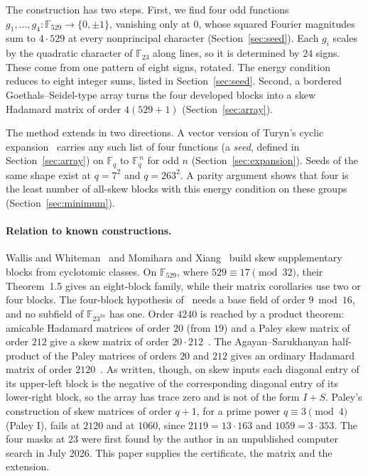 \documentclass[11pt]{article}
\theoremstyle{remark}
\newcommand{\F}{\mathbb F}
\begin{document}
The construction has two steps. First, we find four odd functions $g_1,\dots,g_4\colon\F_{529}\to\{0,\pm1\}$, vanishing only at $0$, whose squared Fourier magnitudes sum to $4\cdot529$ at every nonprincipal character (Section~\ref{sec:seed}). Each $g_i$ scales by the quadratic character of $\F_{23}$ along lines, so it is determined by $24$ signs. These come from one pattern of eight signs, rotated. The energy condition reduces to eight integer sums, listed in Section~\ref{sec:seed}. Second, a bordered Goethals--Seidel-type array turns the four developed blocks into a skew Hadamard matrix of order $4(529+1)$ (Section~\ref{sec:array}).

The method extends in two directions. A vector version of Turyn's cyclic expansion~\cite{Turyn71,Mom} carries any such list of four functions (a \emph{seed}, defined in Section~\ref{sec:array}) on $\F_q$ to $\F_q^{\,n}$ for odd $n$ (Section~\ref{sec:expansion}). Seeds of the same shape exist at $q=7^2$ and $q=263^2$. A parity argument shows that four is the least number of all-skew blocks with this energy condition on these groups (Section~\ref{sec:minimum}).

\paragraph{Relation to known constructions.}
Wallis and Whiteman~\cite{WW} and Momihara and Xiang~\cite{MX} build skew supplementary blocks from cyclotomic classes. On $\F_{529}$, where $529\equiv17\pmod{32}$, their Theorem~1.5 gives an eight-block family, while their matrix corollaries use two or four blocks. The four-block hypothesis of~\cite{MX} needs a base field of order $9\bmod16$, and no subfield of $\F_{23^{2n}}$ has one. Order $4240$ is reached by a product theorem: amicable Hadamard matrices of order $20$ (from $19$) and a Paley skew matrix of order $212$ give a skew matrix of order $20\cdot212$~\cite[Theorem~13]{KS}. The Agayan--Sarukhanyan half-product of the Paley matrices of orders $20$ and $212$ gives an ordinary Hadamard matrix of order $2120$~\cite[Lemma~2.4]{SY}. As written, though, on skew inputs each diagonal entry of its upper-left block is the negative of the corresponding diagonal entry of its lower-right block, so the array has trace zero and is not of the form $I+S$. Paley's construction of skew matrices of order $q+1$, for a prime power $q\equiv3\pmod4$ (Paley I), fails at $2120$ and at $1060$, since $2119=13\cdot163$ and $1059=3\cdot353$. The four masks at $23$ were first found by the author in an unpublished computer search in July 2026. This paper supplies the certificate, the matrix and the extension.
\end{document}

